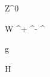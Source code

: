 
\newmathsymbol{\Zboson}      {Z^0}

\newmathsymbol{\Wboson}      {W}
\newmathsymbol{\Wp}          {\Wboson^+}
\newmathsymbol{\Wm}          {\Wboson^-}
\newmathsymbol{\Wpm}         {\Wboson^\pm}

\newmathsymbol{\photon}      {\gamma}

\newmathsymbol{\gluon}       {g}

\newmathsymbol{\higgs}       {H}
